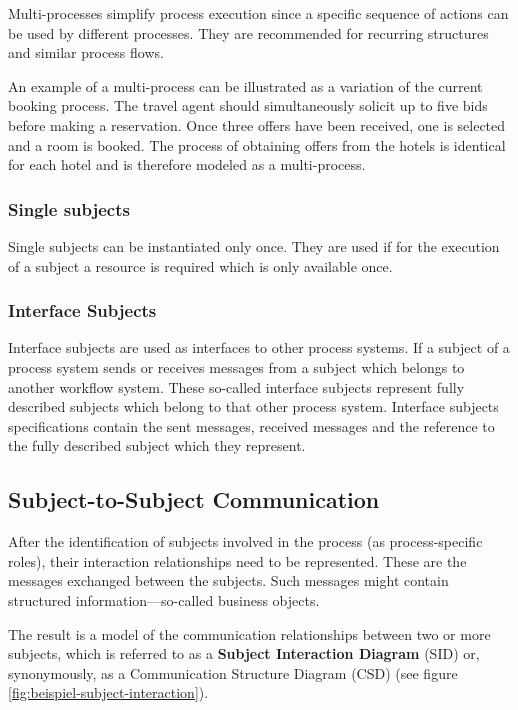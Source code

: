 Multi-processes simplify process execution since a specific sequence of actions can be used by different processes. They are recommended for recurring structures and similar process flows. 

An example of a multi-process can be illustrated as a variation of the current booking process. The travel agent should simultaneously solicit up to five bids before making a reservation. Once three offers have been received, one is selected and a room is booked. The process of obtaining offers from the hotels is identical for each hotel and is therefore modeled as a multi-process.

\subsubsection{Single subjects}

Single subjects can be instantiated only once. They are used if for the execution of a subject a resource is required which is only available once.

\subsubsection{Interface Subjects}

Interface subjects are used as interfaces to other process systems. If a subject of a process system sends or receives messages from a subject which belongs to another workflow system. These so-called interface subjects represent fully described subjects which belong to that other process system. Interface subjects specifications contain the sent messages, received messages and the reference to the fully described subject which they represent.

\subsection{Subject-to-Subject Communication}

After the identification of subjects involved in the process (as process-specific roles), their interaction relationships need to be represented. These are the messages exchanged between the subjects. Such messages might contain structured information—so-called business objects.

The result is a model of the communication relationships between two or more subjects, which is referred to as a \textbf{Subject Interaction Diagram} (SID) or, synonymously, as a Communication Structure Diagram (CSD) (see figure \ref{fig:beispiel-subject-interaction}).

